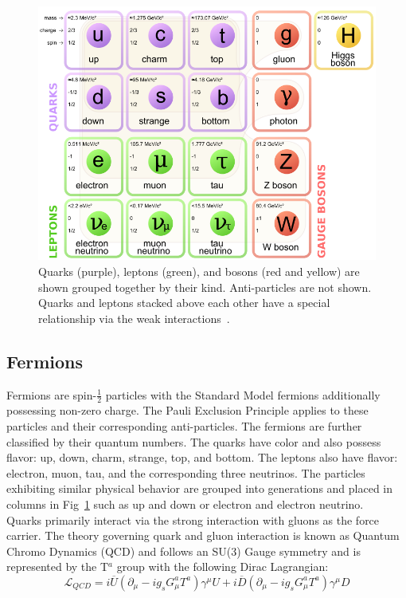 \begin{figure}[h]
\begin{center}
\includegraphics[width=0.8\linewidth]{Figs/Table_of_SM_particles.png}
\caption{\label{fig:standard_particles}
Quarks (purple), leptons (green), and bosons (red and yellow) are shown grouped together by their kind. Anti-particles are not shown. Quarks and leptons stacked above each other have a special relationship via the weak interactions~\cite{wikiparticles}.
}
\end{center}
\end{figure} 

\subsection{Fermions}
Fermions are spin-$\frac{1}{2}$ particles with the Standard Model fermions additionally possessing non-zero charge. The Pauli Exclusion Principle applies to these particles and their corresponding anti-particles. The fermions are further classified by their quantum numbers. The quarks have color and also possess flavor: up, down, charm, strange, top, and bottom. The leptons also have flavor: electron, muon, tau, and the corresponding three neutrinos. The particles exhibiting similar physical behavior are grouped into generations and placed in columns in Fig~\ref{fig:standard_particles} such as up and down or electron and electron neutrino.\\

Quarks primarily interact via the strong interaction with gluons as the force carrier. The theory governing quark and gluon interaction is known as Quantum Chromo Dynamics (QCD) and follows an SU(3) Gauge symmetry and is represented by the T$^a$ group with the following Dirac Lagrangian:
\begin{equation}
\mathcal{L}_{QCD}=i\overline{U}(\partial_\mu - i g_s G^a_\mu T^a)\gamma^\mu U + i\overline{D}(\partial_\mu - i g_s G^a_\mu T^a ) \gamma^\mu D
\end{equation}

